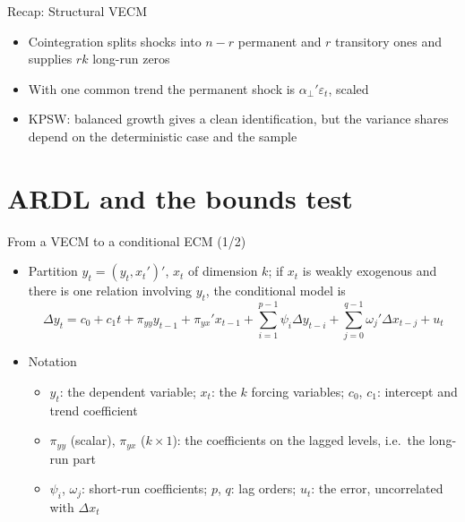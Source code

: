 \begin{frame}{Recap: Structural VECM}
\itemsize{\small}
\begin{itemize}
    \item Cointegration splits shocks into $n - r$ permanent and $r$ transitory ones and supplies $rk$ long-run zeros
    \item With one common trend the permanent shock is $\alpha_\perp'\varepsilon_t$, scaled
    \item KPSW: balanced growth gives a clean identification, but the variance shares depend on the deterministic case and the sample
\end{itemize}
\end{frame}


\section{ARDL and the bounds test}

\begin{frame}{From a VECM to a conditional ECM (1/2)}
\itemsize{\small}
\begin{itemize}
    \item Partition $y_t = (y_t, x_t')'$, $x_t$ of dimension $k$; if $x_t$ is weakly exogenous and there is one relation involving $y_t$, the conditional model is \[ \Delta y_t = c_0 + c_1t + \pi_{yy}y_{t-1} + \pi_{yx}'x_{t-1} + \sum_{i=1}^{p-1}\psi_i\Delta y_{t-i} + \sum_{j=0}^{q-1}\omega_j'\Delta x_{t-j} + u_t \]
    \item Notation 
    \begin{itemize}
        \item $y_t$: the dependent variable; $x_t$: the $k$ forcing variables; $c_0$, $c_1$: intercept and trend coefficient
        \item $\pi_{yy}$ (scalar), $\pi_{yx}$ ($k\times 1$): the coefficients on the lagged levels, i.e.\ the long-run part
        \item $\psi_i$, $\omega_j$: short-run coefficients; $p$, $q$: lag orders; $u_t$: the error, uncorrelated with $\Delta x_t$
    \end{itemize}
\end{itemize}
\end{frame}


